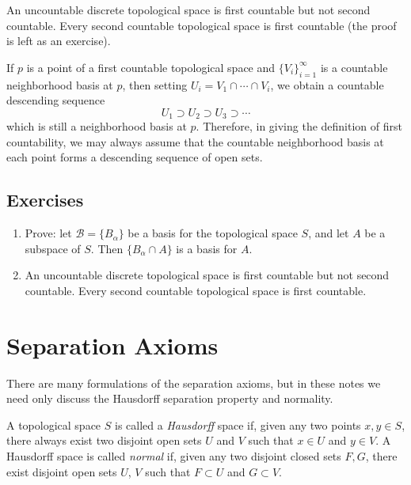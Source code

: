 \begin{example}
	An uncountable discrete topological space is first countable but not
	second countable. Every second countable topological space is first
	countable (the proof is left as an exercise).
\end{example}

If $p$ is a point of a first countable topological space and
$\{V_i\}_{i=1}^\infty$ is a countable neighborhood basis at $p$, then setting
$U_i = V_1 \cap \cdots \cap V_i$, we obtain a countable descending sequence
\begin{displaymath}
	U_1 \supset U_2 \supset U_3 \supset \cdots
\end{displaymath}
which is still a neighborhood basis at $p$. Therefore, in giving the
definition of first countability, we may always assume that the countable
neighborhood basis at each point forms a descending sequence of open sets.




\subsection{Exercises} \label{exsec:bases}
\begin{enumerate}

	\item Prove: let $\mathcal{B} = \{B_\alpha\}$ be a basis for the
	      topological space $S$, and let $A$ be a subspace of $S$. Then
	      $\{B_\alpha\cap A\}$ is a basis for $A$.


	\item An uncountable discrete topological space is first countable but not
	      second countable. Every second countable topological space is first
	      countable.
\end{enumerate}



\section{Separation Axioms}
There are many formulations of the separation axioms, but in these notes we
need only discuss the Hausdorff separation property and normality.

\begin{definition}
	A topological space $S$ is called a \emph{Hausdorff} space if, given any
	two points $x,y\in S$, there always exist two disjoint open sets $U$ and
	$V$ such that $x\in U$ and $y\in V$. A Hausdorff space is called
	\emph{normal} if, given any two disjoint closed sets $F, G$, there exist
	disjoint open sets $U$, $V$ such that $F\subset U$ and $G\subset V$.

\end{definition}

